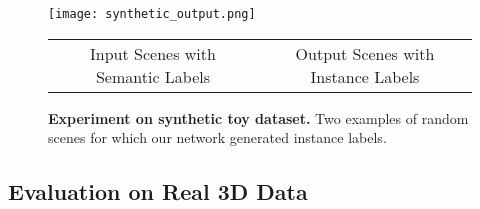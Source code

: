 \documentclass[10pt,twocolumn,letterpaper]{article}
\begin{document}
\begin{figure}[tb]
	\centering
	
	\texttt{[image: synthetic\_output.png]}
	\scriptsize
	\setlength{\tabcolsep}{4mm}
	\begin{tabular}{cc}	   	   
	   Input Scenes with Semantic Labels  & Output Scenes with Instance Labels
	\end{tabular}
\caption{\textbf{Experiment on synthetic toy dataset.} Two examples of random scenes for which our network generated instance labels.}
	\label{fig:synthetic_output}
	\vspace{5pt}
\end{figure}





\subsection{Evaluation on Real 3D Data}
\end{document}
